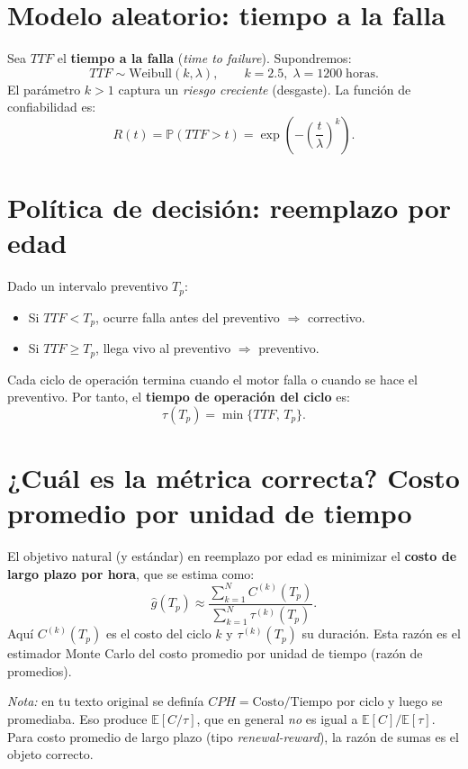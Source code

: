 \documentclass[11pt,a4paper]{article}
\begin{document}
\section{Modelo aleatorio: tiempo a la falla}
Sea $TTF$ el \textbf{tiempo a la falla} (\textit{time to failure}). Supondremos:
\[
TTF \sim \text{Weibull}(k,\lambda), \qquad k=2.5,\;\lambda=1200\;\text{horas}.
\]
El parámetro $k>1$ captura un \emph{riesgo creciente} (desgaste). La función de confiabilidad es:
\[
R(t)=\mathbb{P}(TTF>t)=\exp\!\left(-\left(\frac{t}{\lambda}\right)^k\right).
\]

\section{Política de decisión: reemplazo por edad}
Dado un intervalo preventivo $T_p$:
\begin{itemize}
    \item Si $TTF<T_p$, ocurre falla antes del preventivo $\Rightarrow$ correctivo.
    \item Si $TTF\ge T_p$, llega vivo al preventivo $\Rightarrow$ preventivo.
\end{itemize}

Cada ciclo de operación termina cuando el motor falla o cuando se hace el preventivo. Por tanto, el \textbf{tiempo de operación del ciclo} es:
\[
\tau(T_p) = \min\{TTF,\,T_p\}.
\]

\section{¿Cuál es la métrica correcta? Costo promedio por unidad de tiempo}
El objetivo natural (y estándar) en reemplazo por edad es minimizar el \textbf{costo de largo plazo por hora}, que se estima como:
\[
\widehat{g}(T_p) \approx \frac{\sum_{k=1}^{N} C^{(k)}(T_p)}{\sum_{k=1}^{N} \tau^{(k)}(T_p)}.
\]
Aquí $C^{(k)}(T_p)$ es el costo del ciclo $k$ y $\tau^{(k)}(T_p)$ su duración.
Esta razón es el estimador Monte Carlo del costo promedio por unidad de tiempo (razón de promedios).

\noindent\textit{Nota:} en tu texto original se definía $CPH=\text{Costo}/\text{Tiempo}$ por ciclo y luego se promediaba.
Eso produce $\mathbb{E}[C/\tau]$, que en general \emph{no} es igual a $\mathbb{E}[C]/\mathbb{E}[\tau]$.
Para costo promedio de largo plazo (tipo \textit{renewal-reward}), la razón de sumas es el objeto correcto.
\end{document}
